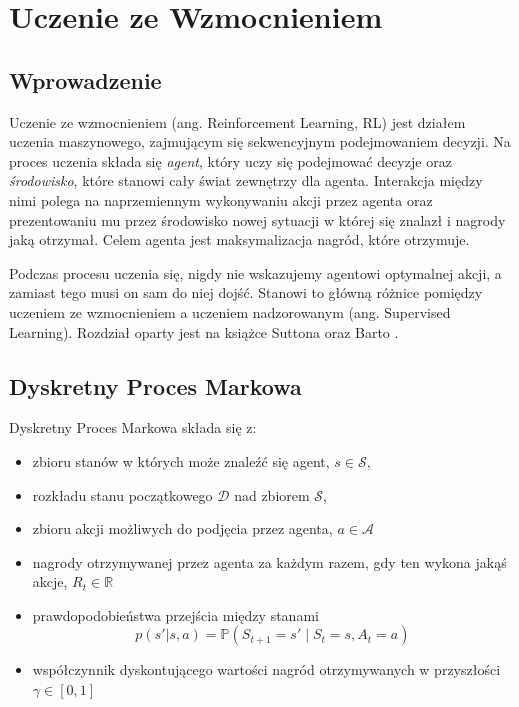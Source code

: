 \documentclass[licencjacka]{pracamgr}
\begin{document}
\chapter{Uczenie ze Wzmocnieniem}\label{r:rl}

\section{Wprowadzenie}

Uczenie ze wzmocnieniem (ang. Reinforcement Learning, RL) \cite{Sutton, Szepesvari} jest działem uczenia maszynowego, zajmującym się sekwencyjnym podejmowaniem decyzji. Na proces uczenia składa się \emph{agent}, który uczy się podejmować decyzje oraz \emph{środowisko}, które stanowi cały świat zewnętrzy dla agenta. Interakcja między nimi polega na naprzemiennym wykonywaniu akcji przez agenta oraz prezentowaniu mu przez środowisko nowej sytuacji w której się znalazł i nagrody jaką otrzymał. Celem agenta jest maksymalizacja nagród, które otrzymuje.

Podczas procesu uczenia się, nigdy nie wskazujemy agentowi optymalnej akcji, a zamiast tego musi on sam do niej dojść. Stanowi to główną różnice pomiędzy uczeniem ze wzmocnieniem a uczeniem nadzorowanym (ang. Supervised Learning). Rozdział oparty jest na książce Suttona oraz Barto \cite{Sutton}.

\section{Dyskretny Proces Markowa}

Dyskretny Proces Markowa składa się z:
\begin{itemize}
\item zbioru stanów w których może znaleźć się agent, $ s \in \mathcal{S} $,
\item rozkładu stanu początkowego $\mathcal{D}$ nad zbiorem $\mathcal{S}$,
\item zbioru akcji możliwych do podjęcia przez agenta, $ a \in \mathcal{A} $
\item nagrody otrzymywanej przez agenta za każdym razem, gdy ten wykona jakąś akcje, $ R_t \in \mathbb{R} $
\item prawdopodobieństwa przejścia między stanami
$$ p(s'|s, a) = \mathbb{P}(S_{t+1} = s' \mid S_t = s, A_t = a)$$
\item współczynnik dyskontującego wartości nagród otrzymywanych w przyszłości $ \gamma \in [0, 1] $
\end{itemize}
\end{document}
